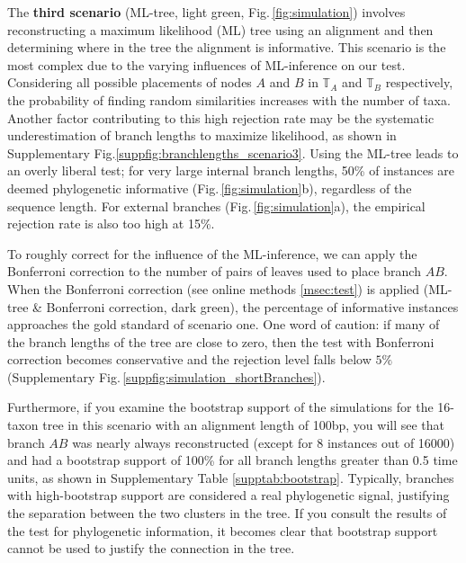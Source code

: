 \medskip
The \textbf{third scenario}  (ML-tree, {\color{MLtree} light green}, Fig.\,\ref{fig:simulation}) involves reconstructing a maximum likelihood (ML) tree using an alignment and then determining where in the tree the alignment is informative. This scenario is the most complex due to the varying influences of ML-inference on our test. Considering all possible placements of nodes  $A$ and $B$ in $\mathbb{T}_A$ and $\mathbb{T}_B$ respectively, the probability of finding random similarities increases with the number of taxa. Another factor contributing to this high rejection rate may be the systematic underestimation of branch lengths to maximize likelihood, as shown in Supplementary Fig.\ref{suppfig:branchlengths_scenario3}. Using the ML-tree leads to an overly liberal test; for very large internal branch lengths, 50\% of instances are deemed phylogenetic informative (Fig.\,\ref{fig:simulation}b), regardless of the sequence length. For external branches (Fig.\,\ref{fig:simulation}a), the empirical rejection rate is also too high at 15\%.

To roughly correct for the influence of the ML-inference, we can apply the Bonferroni correction to the number of pairs of leaves used to place branch $AB$. When the Bonferroni correction (see online methods \ref{msec:test}) is applied (ML-tree \& Bonferroni correction, {\color{MLtreeBonferroni} dark green}), the percentage of informative instances approaches the gold standard of scenario one. One word of caution: if many of the branch lengths of the tree are close to zero, then the test with Bonferroni correction becomes conservative and the rejection level falls below $5\%$ (Supplementary Fig.\,\ref{suppfig:simulation_shortBranches}).


Furthermore, if you examine the bootstrap support of the simulations for the 16-taxon tree in this scenario with an alignment length of 100bp, you will see that branch $AB$ was nearly always reconstructed (except for 8 instances out of 16000) and had a bootstrap support  of 100\% for all branch lengths greater than 0.5 time units, as shown in Supplementary Table \ref{supptab:bootstrap}. Typically, branches with high-bootstrap support are considered a real phylogenetic signal, justifying the separation between the two clusters in the tree. If you consult the results of the test for phylogenetic information, it becomes clear that bootstrap support cannot be used to justify the connection in the tree.

\medskip 

